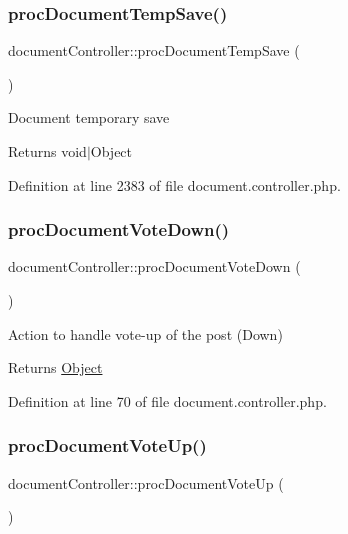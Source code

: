 \subsubsection{\texorpdfstring{proc\+Document\+Temp\+Save()}{procDocumentTempSave()}}
{\footnotesize\ttfamily document\+Controller\+::proc\+Document\+Temp\+Save (\begin{DoxyParamCaption}{ }\end{DoxyParamCaption})}

Document temporary save \begin{DoxyReturn}{Returns}
void$\vert$\+Object 
\end{DoxyReturn}


Definition at line 2383 of file document.\+controller.\+php.

\hypertarget{classdocumentController_a2df8114d4cfbe0a01c6bf29f68884d6e}{}\label{classdocumentController_a2df8114d4cfbe0a01c6bf29f68884d6e} 
\subsubsection{\texorpdfstring{proc\+Document\+Vote\+Down()}{procDocumentVoteDown()}}
{\footnotesize\ttfamily document\+Controller\+::proc\+Document\+Vote\+Down (\begin{DoxyParamCaption}{ }\end{DoxyParamCaption})}

Action to handle vote-\/up of the post (Down) \begin{DoxyReturn}{Returns}
\hyperlink{classObject}{Object} 
\end{DoxyReturn}


Definition at line 70 of file document.\+controller.\+php.

\hypertarget{classdocumentController_a32058ce80d8db1a0b6a97ce1d849afac}{}\label{classdocumentController_a32058ce80d8db1a0b6a97ce1d849afac} 
\subsubsection{\texorpdfstring{proc\+Document\+Vote\+Up()}{procDocumentVoteUp()}}
{\footnotesize\ttfamily document\+Controller\+::proc\+Document\+Vote\+Up (\begin{DoxyParamCaption}{ }\end{DoxyParamCaption})}

